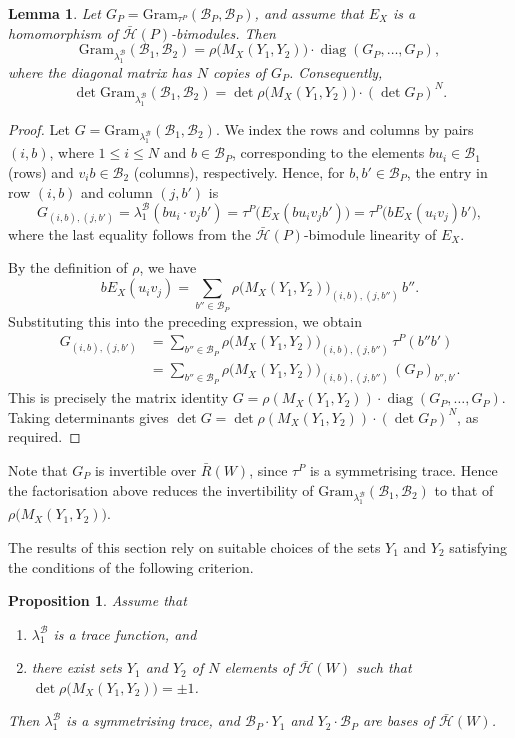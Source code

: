 \documentclass[11pt, reqno]{amsart}
\newcommand{\gram}{\mathrm{Gram}}
\newcommand{\cB}{\mathcal{B}}
\newcommand{\cH}{\mathcal{H}}
\numberwithin{equation}{section}
\newtheorem{lemma}[theorem]{Lemma}
\newtheorem{proposition}[theorem]{Proposition}
\theoremstyle{remark}
\begin{document}
\begin{lemma}\label{twostep}
	Let $G_P=\gram_{\tau^P}(\cB_P,\cB_P)$, and assume that $E_X$ is a homomorphism of $\bar{\cH}(P)$-bimodules. Then
	\[
	\gram_{\lambda_1^{\cB}}(\cB_1,\cB_2)=\rho\bigl(M_X(Y_1,Y_2)\bigr)\cdot\operatorname{diag}(G_P,\ldots,G_P),
	\]
	where the diagonal matrix has $N$ copies of $G_P$. Consequently,
	\[
	\det\gram_{\lambda_1^{\cB}}(\cB_1,\cB_2)=\det\rho\bigl(M_X(Y_1,Y_2)\bigr)\cdot(\det G_P)^N.
	\]
\end{lemma}

\begin{proof}
	Let $G=\gram_{\lambda_1^{\cB}}(\cB_1,\cB_2)$. We index the rows and columns by pairs $(i,b)$, where $1\leq i\leq N$ and $b\in\cB_P$, corresponding to the elements $bu_i\in\cB_1$ (rows) and $v_ib\in\cB_2$ (columns), respectively. Hence, for $b,b'\in\cB_P$, the entry in row $(i,b)$ and column $(j,b')$ is
$$		G_{(i,b),(j,b')}=\lambda_1^{\cB}(bu_i\cdot v_jb')
		=\tau^P\bigl(E_X(bu_iv_jb')\bigr)
		=\tau^P\bigl(bE_X(u_iv_j)b'\bigr),
	$$
	where the last equality follows from the $\bar{\cH}(P)$-bimodule linearity of $E_X$.
	
	By the definition of $\rho$, we have
	\[
	bE_X(u_iv_j)=\sum_{b''\in\cB_P}\rho\bigl(M_X(Y_1,Y_2)\bigr)_{(i,b),(j,b'')}\,b''.
	\]
	Substituting this into the preceding expression, we obtain
	\[
	\begin{aligned}
		G_{(i,b),(j,b')}&=\sum_{b''\in\cB_P}\rho\bigl(M_X(Y_1,Y_2)\bigr)_{(i,b),(j,b'')}\,\tau^P(b''b')\\
		&=\sum_{b''\in\cB_P}\rho\bigl(M_X(Y_1,Y_2)\bigr)_{(i,b),(j,b'')}\,(G_P)_{b'',b'}.
	\end{aligned}
	\]
	This is precisely the matrix identity $G=\rho(M_X(Y_1,Y_2))\cdot\operatorname{diag}(G_P,\ldots,G_P)$. Taking determinants gives $\det G=\det\rho(M_X(Y_1,Y_2))\cdot(\det G_P)^N$, as required.
\end{proof}

Note that $G_P$ is invertible over $\bar R(W)$, since $\tau^P$ is a symmetrising trace. Hence the factorisation above reduces the invertibility of $\gram_{\lambda_1^{\cB}}(\cB_1,\cB_2)$ to that of $\rho\bigl(M_X(Y_1,Y_2)\bigr)$.

The results of this section rely on suitable choices of the sets $Y_1$ and $Y_2$ satisfying the conditions of the following criterion.

\begin{proposition}\label{symcond2} 
	Assume that
	\begin{enumerate}
		\item $\lambda^{\cB}_1$ is a trace function, and
		\item there exist sets $Y_1$ and $Y_2$ of $N$ elements of
		$\bar{\cH}(W)$ such that $\det\rho\big(M_X(Y_1,Y_2)\big)=\pm1$.
	\end{enumerate}
	Then $\lambda^{\cB}_1$ is a symmetrising trace, and
	$\cB_P\cdot Y_1$ and $Y_2\cdot\cB_P$ are bases of
	$\bar{\cH}(W)$.
\end{proposition}
\end{document}

